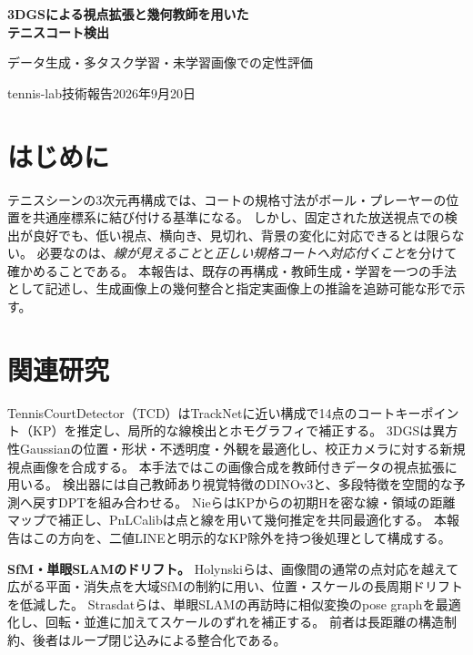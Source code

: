 \documentclass[a4paper,10pt]{article}
\newcommand{\sect}[1]{\section{#1}\vspace{-1mm}}
\begin{document}
\begin{center}
{\sffamily\bfseries\fontsize{17}{23}\selectfont\color{ink}3DGSによる視点拡張と幾何教師を用いた\\テニスコート検出}\par\vspace{2mm}
{\fontsize{10}{14}\selectfont データ生成・多タスク学習・未学習画像での定性評価}\par\vspace{2mm}
{\sffamily\fontsize{8}{11}\selectfont tennis-lab\quad 技術報告\quad 2026年9月20日}
\end{center}\par
\vspace{-1mm}
\begin{abstract}
放送映像に偏ったコート検出器を、多様な撮影視点へ適用するための実装済みパイプラインを整理する。
実動画から3D Gaussian Splatting（3DGS）でシーンを再構成し、地面と規格コートを位置合わせして、新規視点のRGBと幾何教師を生成する。
これを実画像と混合し、凍結DINOv3特徴にTransformer・DPT・複数の予測ヘッドを接続して学習する。
指定写真4枚の保存推論に対し、KP候補をLINEで選び、外れ値KPを除外して点と線を共同最適化する。
LINEとの整合は改善したが、遮蔽や線の対応の曖昧さは残る。
B00--B03各3視点の実レンダリングと全4枚の推論を掲載する。
\end{abstract}

\sect{はじめに}
テニスシーンの3次元再構成では、コートの規格寸法がボール・プレーヤーの位置を共通座標系に結び付ける基準になる。
しかし、固定された放送視点での検出が良好でも、低い視点、横向き、見切れ、背景の変化に対応できるとは限らない。
必要なのは、\emph{線が見えること}と\emph{正しい規格コートへ対応付くこと}を分けて確かめることである。
本報告は、既存の再構成・教師生成・学習を一つの手法として記述し、生成画像上の幾何整合と指定実画像上の推論を追跡可能な形で示す。

\sect{関連研究}
TennisCourtDetector（TCD）\cite{tcd}はTrackNetに近い構成で14点のコートキーポイント（KP）を推定し、局所的な線検出とホモグラフィで補正する。
3DGS\cite{gs}は異方性Gaussianの位置・形状・不透明度・外観を最適化し、校正カメラに対する新規視点画像を合成する。
本手法ではこの画像合成を教師付きデータの視点拡張に用いる。
検出器には自己教師あり視覚特徴のDINOv3\cite{dino}と、多段特徴を空間的な予測へ戻すDPT\cite{dpt}を組み合わせる。
Nieら\cite{dense_registration}はKPからの初期Hを密な線・領域の距離マップで補正し、PnLCalib\cite{pnlcalib}は点と線を用いて幾何推定を共同最適化する。
本報告はこの方向を、二値LINEと明示的なKP除外を持つ後処理として構成する。

\textbf{SfM・単眼SLAMのドリフト。}
Holynskiら\cite{drift}は、画像間の通常の点対応を越えて広がる平面・消失点を大域SfMの制約に用い、位置・スケールの長周期ドリフトを低減した。
Strasdatら\cite{scale_drift}は、単眼SLAMの再訪時に相似変換のpose graphを最適化し、回転・並進に加えてスケールのずれを補正する。
前者は長距離の構造制約、後者はループ閉じ込みによる整合化である。
\end{document}
